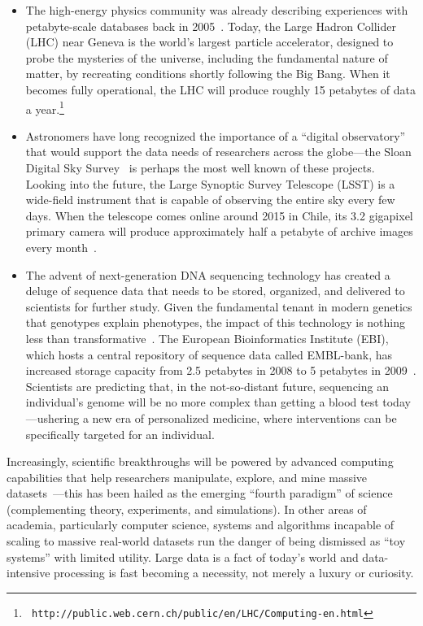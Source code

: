 \begin{itemize}

\item The high-energy physics community was already describing
  experiences with petabyte-scale databases back in
  2005~\cite{Becla_Wang_2005}.  Today, the Large Hadron Collider (LHC)
  near Geneva is the world's largest particle accelerator, designed to
  probe the mysteries of the universe, including the fundamental
  nature of matter, by recreating conditions shortly following the Big
  Bang.  When it becomes fully operational, the LHC will produce
  roughly 15 petabytes of data a year.\footnote{\tt
    http://public.web.cern.ch/public/en/LHC/Computing-en.html}

\item Astronomers have long recognized the importance of a ``digital
  observatory'' that would support the data needs of researchers
  across the globe---the Sloan Digital Sky
  Survey~\cite{Szalay_etal_2000} is perhaps the most well known of
  these projects.  Looking into the future, the Large Synoptic Survey
  Telescope (LSST) is a wide-field instrument that is capable of
  observing the entire sky every few days.  When the telescope comes
  online around 2015 in Chile, its 3.2 gigapixel primary camera will
  produce approximately half a petabyte of archive images every
  month~\cite{Becla_etal_2006}.

\item The advent of next-generation DNA sequencing technology has
  created a deluge of sequence data that needs to be stored,
  organized, and delivered to scientists for further study.  Given the
  fundamental tenant in modern genetics that genotypes explain
  phenotypes, the impact of this technology is nothing less than
  transformative~\cite{Mardis_2008}.  The European Bioinformatics
  Institute (EBI), which hosts a central repository of sequence data
  called EMBL-bank, has increased storage capacity from 2.5 petabytes
  in 2008 to 5 petabytes in 2009~\cite{Southan_Cameron_2009}.
  Scientists are predicting that, in the not-so-distant future,
  sequencing an individual's genome will be no more complex than
  getting a blood test today---ushering a new era of personalized
  medicine, where interventions can be specifically targeted for an
  individual.

\end{itemize}

\noindent Increasingly, scientific breakthroughs will be powered by
advanced computing capabilities that help researchers manipulate,
explore, and mine massive datasets~\cite{Hey_etal_2009}---this has
been hailed as the emerging ``fourth paradigm'' of
science~\cite{Hey_etal_2009-Gray} (complementing theory, experiments,
and simulations).  In other areas of academia, particularly computer
science, systems and algorithms incapable of scaling to massive
real-world datasets run the danger of being dismissed as ``toy
systems'' with limited utility.  Large data is a fact of today's world
and data-intensive processing is fast becoming a necessity, not merely
a luxury or curiosity.

